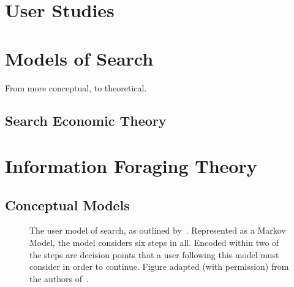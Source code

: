 \section{User Studies}

\section{Models of Search}
From more conceptual, to theoretical.

\subsection{Search Economic Theory}

\section{Information Foraging Theory}

\subsection{Conceptual Models}

\begin{figure}[t!]
    \centering
    \caption[Model of the search process by~\cite{baskaya2013behavioural_factors}]{The user model of search, as outlined by~\citealt{baskaya2013behavioural_factors}. Represented as a Markov Model, the model considers six steps in all. Encoded within two of the steps are decision points that a user following this model must consider in order to continue. Figure adapted (with permission) from the authors of~\citealt{baskaya2013behavioural_factors}.}
    \label{fig:baskaya_model}
\end{figure}

